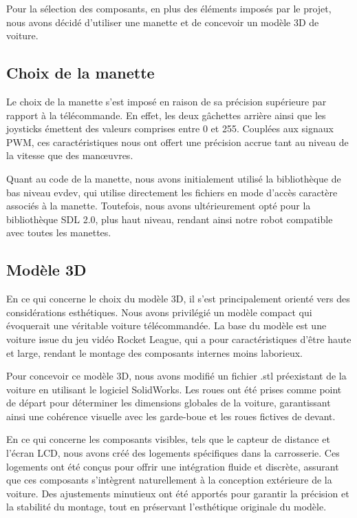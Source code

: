 Pour la sélection des composants, en plus des éléments imposés par le projet, nous avons décidé d'utiliser une manette et de concevoir un modèle 3D de voiture.

\subsection{Choix de la manette}
Le choix de la manette s'est imposé en raison de sa précision supérieure par rapport à la télécommande. En effet, les deux gâchettes arrière ainsi que les joysticks émettent des valeurs comprises entre 0 et 255. Couplées aux signaux PWM, ces caractéristiques nous ont offert une précision accrue tant au niveau de la vitesse que des manœuvres.

Quant au code de la manette, nous avons initialement utilisé la bibliothèque de bas niveau evdev, qui utilise directement les fichiers en mode d'accès caractère associés à la manette. Toutefois, nous avons ultérieurement opté pour la bibliothèque SDL 2.0, plus haut niveau, rendant ainsi notre robot compatible avec toutes les manettes.

\subsection{Modèle 3D}
En ce qui concerne le choix du modèle 3D, il s'est principalement orienté vers des considérations esthétiques. Nous avons privilégié un modèle compact qui évoquerait une véritable voiture télécommandée. La base du modèle est une voiture issue du jeu vidéo Rocket League, qui a pour caractéristiques d'être haute et large, rendant le montage des composants internes moins laborieux.

Pour concevoir ce modèle 3D, nous avons modifié un fichier .stl préexistant de la voiture en utilisant le logiciel SolidWorks. Les roues ont été prises comme point de départ pour déterminer les dimensions globales de la voiture, garantissant ainsi une cohérence visuelle avec les garde-boue et les roues fictives de devant. 

En ce qui concerne les composants visibles, tels que le capteur de distance et l'écran LCD, nous avons créé des logements spécifiques dans la carrosserie. Ces logements ont été conçus pour offrir une intégration fluide et discrète, assurant que ces composants s'intègrent naturellement à la conception extérieure de la voiture. Des ajustements minutieux ont été apportés pour garantir la précision et la stabilité du montage, tout en préservant l'esthétique originale du modèle.


